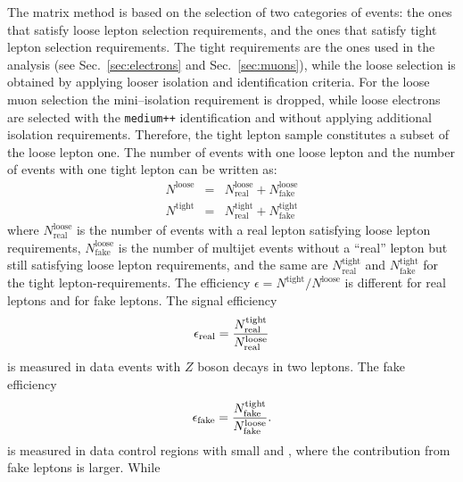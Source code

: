 The matrix method is based on the selection of two categories of
events: the ones that satisfy loose lepton selection requirements, and
the ones that satisfy tight lepton selection requirements. The tight
requirements are the ones used in the analysis (see
Sec.~\ref{sec:electrons} and Sec.~\ref{sec:muons}), while the loose
selection is obtained by applying looser isolation and identification
criteria. For the loose muon selection the mini--isolation requirement
is dropped, while loose electrons are selected with the
\texttt{medium++} identification and without applying additional
isolation requirements.
Therefore, the tight lepton sample constitutes a subset of
the loose lepton one.
The number of events with one loose lepton and
the number of events with one tight lepton can be written as:
%                                                                                             
\begin{eqnarray}
  N^\mathrm{loose}
  & = & N^\mathrm{loose}_\mathrm{real}
  + N^{\mathrm{loose}}_\mathrm{fake} \nonumber \\
  N^\mathrm{tight}
  & = & N^\mathrm{tight}_\mathrm{real}
  + N^{\mathrm{tight}}_\mathrm{fake}
  \label{eqn:intro-mm-Nloose}
\end{eqnarray}
%                                                                                             
where $N^\mathrm{loose}_\mathrm{real}$ is the number of events with a
real lepton satisfying loose lepton requirements,
$N^\mathrm{loose}_\mathrm{fake}$ is the number of multijet events
without a ``real'' lepton but still satisfying loose
lepton requirements, and the same are $N^\mathrm{tight}_\mathrm{real}$
and $N^\mathrm{tight}_\mathrm{fake}$ for the tight
lepton-requirements. The efficiency
$\epsilon=N^\mathrm{tight}/N^\mathrm{loose}$ is different for real
leptons and for fake leptons. The signal efficiency
%                                                                                             
\begin{equation}
  \epsilon_{\mathrm{real}}{}
  = \frac{N^\mathrm{tight}_\mathrm{real}}{N^\mathrm{loose}_\mathrm{real}}
\end{equation}
is measured in data events with $Z$ boson decays in two leptons.
The fake efficiency
\begin{equation}
  \epsilon_{\mathrm{fake}}{}
  = \frac{N^\mathrm{tight}_\mathrm{fake}}{N^\mathrm{loose}_\mathrm{fake}}.
  \label{eqn:intro-mm-real-fake}
\end{equation}
is measured in data control regions with small \met{} and \mtw{},
where the contribution from fake leptons is larger. While \effReal{}
